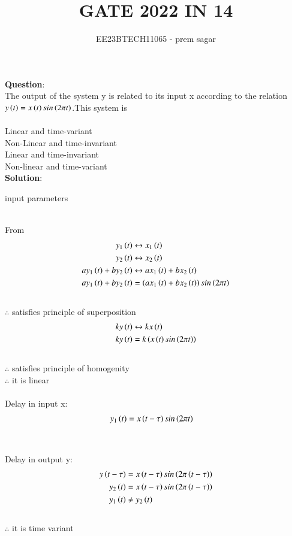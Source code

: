 \documentclass[journal,12pt,twocolumn]{IEEEtran}
\theoremstyle{remark}
\begin{document}

\vspace{3cm}

\title{GATE 2022 IN 14}
\author{EE23BTECH11065 - prem sagar}
\maketitle
\newpage

\bigskip

\renewcommand{\thefigure}{\theenumi}
\renewcommand{\thetable}{\theenumi}
\textbf{Question}:
\\The output of the system y is related to its input x according to the relation $y\left(t\right)=x\left(t\right)sin\left(2\pi t\right)$.This system is 
\\\\ Linear and time-variant
\\ Non-Linear and time-invariant
\\ Linear and time-invariant
\\ Non-linear and time-variant
\\\textbf{Solution}:
\begin{table}[!ht]
\def\arraystretch{1.5}
   \centering
    \renewcommand\thetable{1}
      
    \caption{input parameters}
    \label{tab:IN 14}
 \end{table}
 \\From {}
\\\begin{align}
y_1\left(t\right)&\leftrightarrow x_1\left(t\right)
\\y_2\left(t\right)&\leftrightarrow x_2\left(t\right)
\\ay_1\left(t\right)+by_2\left(t\right)&\leftrightarrow ax_1\left(t\right)+bx_2\left(t\right)
\\ay_1\left(t\right)+by_2\left(t\right)&=\left(ax_1\left(t\right)+bx_2\left(t\right)\right)sin\left(2\pi t\right)
\end{align}
\\$\therefore$ satisfies principle of superposition
\begin{align}
ky\left(t\right)&\leftrightarrow kx\left(t\right)
\\ky\left(t\right)&=k\left(x\left(t\right)sin\left(2\pi t\right)\right)
\end{align}
\\$\therefore$ satisfies principle of homogenity
\\$\therefore$ it is linear
\\\\Delay in input x:
\begin{align}
y_1\left(t\right)&=x\left(t-\tau\right)sin\left(2\pi t\right)
\end{align}
\\\\Delay in output y:
\begin{align}
y\left(t-\tau\right)&=x\left(t-\tau\right)sin\left(2\pi\left(t-\tau\right)\right)
\\y_2\left(t\right)&=x\left(t-\tau\right)sin\left(2\pi\left(t-\tau\right)\right)
\\y_1\left(t\right)&\neq y_2\left(t\right)
\end{align}
\\$\therefore$ it is time variant
\end{document}
